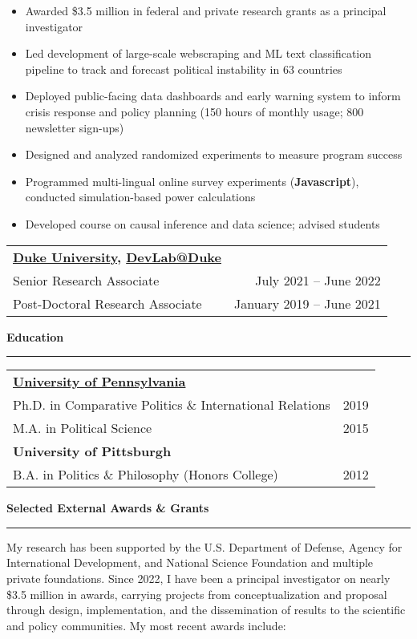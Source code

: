 \documentclass[11pt]{article}
\begin{document}
\begin{itemize}[itemsep=0mm, parsep=0pt]
\item Awarded \$3.5 million in federal and private research grants as a principal investigator 
\item Led development of large-scale webscraping and ML text classification pipeline to track and forecast political instability in 63 countries
\item Deployed public-facing data dashboards and early warning system to inform crisis response and policy planning (150 hours of monthly usage; 800 newsletter sign-ups)
\item Designed and analyzed randomized experiments to measure program success
\item Programmed multi-lingual online survey experiments (\textbf{Javascript}), conducted simulation-based power calculations
\item Developed course on causal inference and data science; advised students
\end{itemize}

\noindent\begin{tabular*}{\textwidth}{@{}l@{\extracolsep{\fill}}r@{}}
\textbf{\href{https://polisci.duke.edu/}{Duke University}, \href{https://www.devlabduke.com/}{DevLab@Duke}}\\
Senior Research Associate & July 2021 -- June 2022\\
Post-Doctoral Research Associate & January 2019 -- June 2021\\
\end{tabular*}


\textbf{\large Education}\\
\rule[3mm]{\textwidth}{.2pt}
\noindent\begin{tabular*}{\textwidth}{@{}l@{\extracolsep{\fill}}r@{}}
\textbf{\href{https://www.sas.upenn.edu/polisci/}{University of Pennsylvania}}\\
Ph.D. in Comparative Politics \& International Relations & 2019\\
M.A. in Political Science & 2015\\
\textbf{University of Pittsburgh}\\
B.A. in Politics \& Philosophy (Honors College) & 2012
\end{tabular*}

\textbf{\large Selected External Awards \& Grants}\\
\rule[3mm]{\textwidth}{.2pt}
My research has been supported by the U.S. Department of Defense, Agency for International Development, and National Science Foundation and multiple private foundations. Since 2022, I have been a principal investigator on nearly \$3.5 million in awards, carrying projects from conceptualization and proposal through design, implementation, and the dissemination of results to the scientific and policy communities. My most recent awards include:
\end{document}
